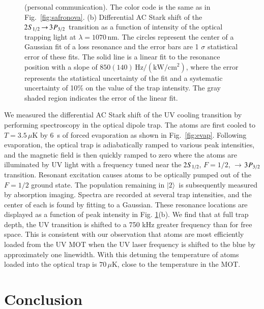 \documentclass[oneside,12pt]{memoir}
\newcommand{\twos}[1]{\ensuremath{\hspace{-1pt}2\hspace{0.5pt}\hspace{0pt}S_{#1}\hspace{-1pt}}}
\newcommand{\trep}[1]{\ensuremath{\hspace{-1pt}3\hspace{0.5pt}\hspace{0pt}P_{#1}\hspace{-1pt}}}
\newcommand{\uv}{\ensuremath{ \twos{1/2}\hspace{-0.0pt}\rightarrow\hspace{-0.0pt}\trep{3/2} }\ }
\newcommand{\two}{\ensuremath{|2\rangle }\ }
\begin{document}
\begin{figure}
{(personal communication). The color code is the same as in
Fig.~\ref{fig:safronova}.  
(b) Differential AC Stark shift of the \uv transition
as a function of intensity of the optical trapping light at
$\lambda=1070\,\mathrm{nm}$.  The circles represent the center of a Gaussian fit of a loss
resonance and the error bars are 1 $\sigma$ statistical error of these fits.
The solid line is a linear fit to the resonance position with a slope of
$850(140) \,\mathrm{Hz/(kW/cm^{2})}$, where the error represents the
statistical uncertainty of the fit and a systematic uncertainty of 10\% on the
value of the trap intensity.  The gray shaded region indicates the error of the
linear fit. } \label{fig:lightshift} \end{figure}

We measured the differential AC Stark shift of the UV cooling transition  by
performing spectroscopy in the optical dipole trap.  The atoms are first cooled
to $T=3.5\,\mu$K by $6$~s of forced evaporation as shown in
Fig.~\ref{fig:evap}.  Following evaporation, the optical trap is adiabatically
ramped to various peak intensities, and the magnetic field is then quickly
ramped to zero where the atoms are illuminated by UV light with a frequency
tuned near the \twos{1/2}, $F=1/2$, $\rightarrow\,$\trep{3/2} transition.
Resonant excitation causes atoms to be optically pumped out of the $F=1/2$
ground state.  The population remaining in \two is subsequently measured by
absorption imaging.  Spectra are recorded at several trap intensities, and the
center of each is found by fitting to a Gaussian.  These resonance locations
are displayed as a function of peak intensity in Fig.  \ref{fig:lightshift}(b).
We find that at full trap depth, the UV transition is shifted to a 750 kHz
greater frequency than for free space.  This is consistent with our observation
that atoms are most efficiently loaded from the UV MOT when the UV laser
frequency is shifted to the blue by approximately one linewidth.  With this
detuning the temperature of atoms loaded into the optical trap is
$70\,\mu$K, close to the temperature in the MOT.  



\chapter{Conclusion} 
\label{ch:conclusion}
\end{document}
